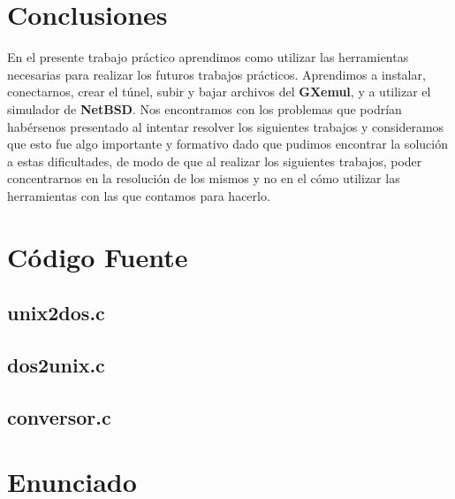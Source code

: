 \documentclass[a4paper,10pt]{article}
\begin{document}
\newpage
\section{Conclusiones}
     En el presente trabajo pr\'actico aprendimos como utilizar las herramientas necesarias para realizar los futuros trabajos
     pr\'acticos. Aprendimos a instalar, conectarnos, crear el t\'unel, subir y bajar archivos del {\bf GXemul}, y a utilizar 
     el simulador de {\bf NetBSD}. Nos encontramos con los problemas que podr\'ian hab\'ersenos presentado
     al intentar resolver los siguientes trabajos y consideramos que esto fue algo importante y formativo dado que pudimos encontrar la soluci\'on
     a estas dificultades, de modo de que al realizar los siguientes trabajos, poder concentrarnos en la resoluci\'on de los mismos y no en el c\'omo
     utilizar las herramientas con las que contamos para hacerlo.
     


\appendix
\newpage
\section{C\'odigo Fuente}
  \subsection{unix2dos.c}
    \lstset{numbers=left, frame=single, breaklines=true}
    
  \subsection{dos2unix.c}
    \lstset{numbers=left, frame=single, breaklines=true}
    
  \subsection{conversor.c}
    \lstset{numbers=left, frame=single, breaklines=true}
    

\newpage
\section{Enunciado}

\end{document}
